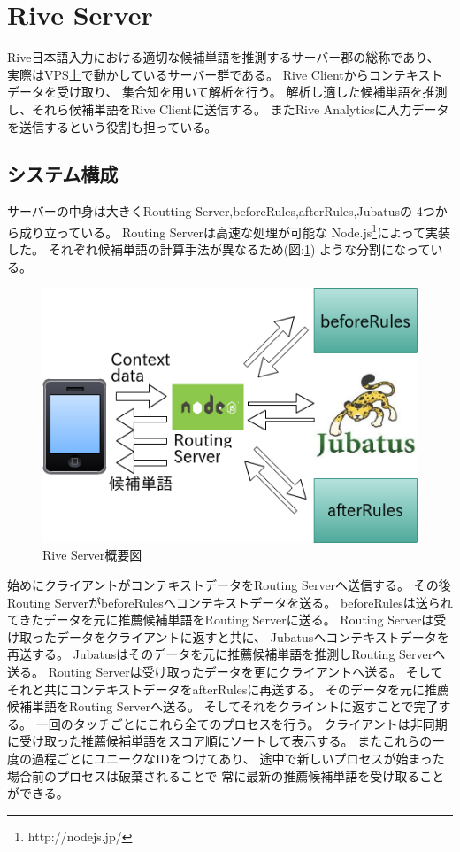 \section{Rive Server}
\label{sec:riveserver}
Rive日本語入力における適切な候補単語を推測するサーバー郡の総称であり、
実際はVPS上で動かしているサーバー群である。
Rive Clientからコンテキストデータを受け取り、
集合知を用いて解析を行う。
解析し適した候補単語を推測し、それら候補単語をRive Clientに送信する。
またRive Analyticsに入力データを送信するという役割も担っている。

\subsection{システム構成}
サーバーの中身は大きくRoutting Server,beforeRules,afterRules,Jubatusの
4つから成り立っている。
Routing Serverは高速な処理が可能な
Node.js\footnote{http://nodejs.jp/}によって実装した。
それぞれ候補単語の計算手法が異なるため(図:\ref{fig:riveserver})
ような分割になっている。
\begin{figure}[htbp]
  \begin{center}
    \includegraphics[width=14cm,bb=0 0 466 316]{images/riveserver.png}
  \end{center}
  \caption{Rive Server概要図}
  \label{fig:riveserver}
\end{figure}
始めにクライアントがコンテキストデータをRouting Serverへ送信する。
その後Routing ServerがbeforeRulesへコンテキストデータを送る。
beforeRulesは送られてきたデータを元に推薦候補単語をRouting Serverに送る。
Routing Serverは受け取ったデータをクライアントに返すと共に、
Jubatusへコンテキストデータを再送する。
Jubatusはそのデータを元に推薦候補単語を推測しRouting Serverへ送る。
Routing Serverは受け取ったデータを更にクライアントへ送る。
そしてそれと共にコンテキストデータをafterRulesに再送する。
そのデータを元に推薦候補単語をRouting Serverへ送る。
そしてそれをクライントに返すことで完了する。
一回のタッチごとにこれら全てのプロセスを行う。
クライアントは非同期に受け取った推薦候補単語をスコア順にソートして表示する。
またこれらの一度の過程ごとにユニークなIDをつけてあり、
途中で新しいプロセスが始まった場合前のプロセスは破棄されることで
常に最新の推薦候補単語を受け取ることができる。

